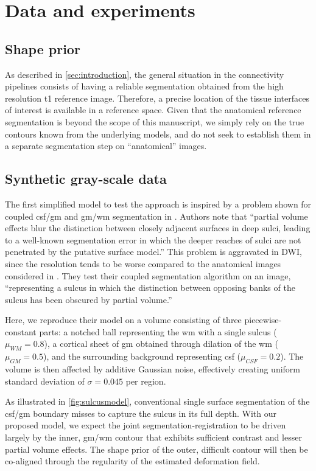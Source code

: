 \section{Data and experiments}
\label{sec:experiments}
%
\subsection{Shape prior}
%
As described in \autoref{sec:introduction}, the general situation in
the connectivity pipelines consists of having 
a reliable segmentation obtained from the high resolution \gls{t1} 
reference image. Therefore, a precise location of the tissue interfaces
of interest is available in a reference space. Given that the anatomical 
reference segmentation is beyond the scope of this manuscript, we simply 
rely on the true contours known from the underlying models, and do not 
seek to establish them in a separate segmentation step on ``anatomical'' images.
%
\subsection{Synthetic gray-scale data}
%
The first simplified model to test the approach is inspired by a problem 
shown for coupled \gls{csf}/\gls{gm} and \gls{gm}/\gls{wm} segmentation in \citep{macdonald_automated_2000}. Authors note that ``partial volume effects 
blur the distinction between closely adjacent surfaces in deep sulci, leading 
to a well-known segmentation error in which the deeper reaches of sulci are 
not penetrated by the putative surface model.'' This problem is aggravated 
in DWI, since the resolution tends to be worse compared to the anatomical 
images considered in \citep{macdonald_automated_2000}. They test their 
coupled segmentation algorithm on an image, ``representing a sulcus in 
which the distinction between opposing banks of the sulcus has been obscured 
by partial volume.''  

Here, we reproduce their model on a volume consisting of three 
piecewise-constant parts: a notched ball representing the \gls{wm} with a single 
sulcus ($\mu_{WM} = 0.8$), a cortical sheet of \gls{gm} obtained through dilation 
of the \gls{wm} ($\mu_{GM} = 0.5$), and the surrounding background representing 
\gls{csf} ($\mu_{CSF} = 0.2$). The volume is then affected by additive Gaussian 
noise, effectively creating uniform standard deviation of $\sigma = 0.045$ per 
region.

As illustrated in \autoref{fig:sulcusmodel}, conventional single surface 
segmentation of the \gls{csf}/\gls{gm} boundary misses to capture the sulcus in 
its full depth. With our proposed model, we expect the joint 
segmentation-registration to be driven largely by the inner, \gls{gm}/\gls{wm}
contour that exhibits sufficient contrast and lesser partial volume effects. 
The shape prior of the outer, difficult contour will then be co-aligned through 
the regularity of the estimated deformation field.

